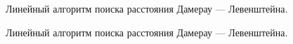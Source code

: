 \documentclass[a4paper, 14pt]{article}
\begin{document}
\begin{figure}[pt!]
\caption{Линейный алгоритм поиска расстояния Дамерау — Левенштейна.}
\label{ris:dam3}
\end{figure}

\begin{figure}[pt!]
\caption{Линейный алгоритм поиска расстояния Дамерау — Левенштейна.}
\label{ris:minim}
\end{figure}
\end{document}
